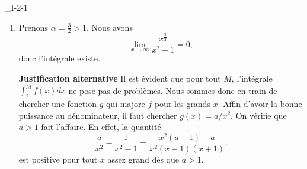 \begin{corrige}{_I-2-1}
\begin{enumerate}
{\bf Justification alternative}
Prouvons que l'intégrale
\begin{equation}
	\int_2^{\infty}\frac{ \ln(x) }{ x^{1+\epsilon} }
\end{equation}
converge pour tout $\epsilon>0$. Pour tout $\alpha>0$, nous avons
\begin{equation}
	\lim_{x\to\infty}\frac{ \ln(x) }{ x^{\alpha} }=\lim_{x\to\infty}\frac{ 1/x }{ \alpha x^{\alpha-1} }=\lim_{x\to\infty}\frac{1}{ \alpha x^{\alpha} }=0,
\end{equation}
donc la fonction $x\mapsto \ln(x)/x^{\alpha}$ est bornée pour tout $\alpha >0$. Maintenant,
\begin{equation}
	\frac{ \ln(x) }{ x^{1+\epsilon} }=\frac{ \ln(x) }{ x^{\epsilon/2} }\cdot\frac{1}{ x^{1+\epsilon/2} }
\end{equation}
où le premier terme peut être majoré par une certaine constante $M$. Par conséquent,
\begin{equation}
	\frac{ \ln(x) }{ x^{1+\epsilon} }<M\frac{ 1 }{ x^{1+\epsilon/2} },
\end{equation}
dont le membre de droite a une intégrale qui converge sur $[2,\infty[$ pour tout $\epsilon>0$. Nous avons donc existence de l'intégrale lorsque $3/p >1$.

\item

Prenons $\alpha=\frac{ 3 }{ 2 }>1$. Nous avons
\begin{equation}
	\lim_{x\to\infty}\frac{ x^{\frac{ 3 }{ 2 }} }{ x^2-1 }=0,
\end{equation}
donc l'intégrale existe.

{\bf Justification alternative}
Il est évident que pour tout $M$, l'intégrale $\int_2^Mf(x)dx$ ne pose pas de problèmes. Nous sommes donc en train de chercher une fonction $g$ qui majore $f$ pour les grands $x$. Affin d'avoir la bonne puissance au dénominateur, il faut chercher $g(x)=a/x^2$. On vérifie que $a>1$ fait l'affaire. En effet, la quantité
\begin{equation}
	\frac{ a }{ x^2 }-\frac{ 1 }{ x^2-1 }=\frac{ x^2(a-1)-a }{ x^2(x-1)(x+1) }.
\end{equation}
est positive pour tout $x$ assez grand dès que $a>1$.

\end{enumerate}
\end{corrige}
